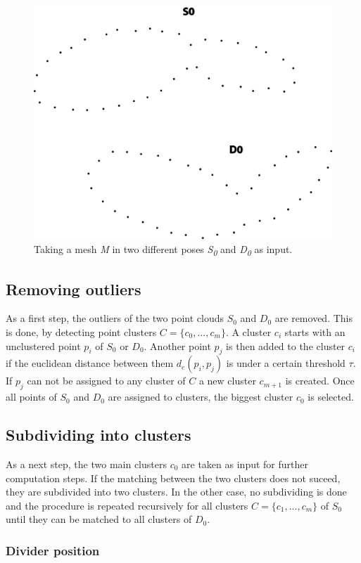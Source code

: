\documentclass[a4paper,english,11pt]{report}
\begin{document}
\begin{figure}
	\centering
	\includegraphics[width=0.7\linewidth]{illustration_original}
	\caption{Taking a mesh \textit{M} in two different poses \textit{S\textsubscript{0}} and \textit{D\textsubscript{0}} as input.}
	\label{fig:dc_original_p2}
\end{figure}

\subsection{Removing outliers}

As a first step, the outliers of the two point clouds $S_0$ and $D_0$ are removed. This is done, by detecting point clusters $C = \{{c_0, ... , c_m}\}$. A cluster $c_i$ starts with an unclustered point $p_i$ of $S_0$ or $D_0$. Another point $p_j$ is then added to the cluster $c_i$ if the euclidean distance between them $d_e(p_i, p_j)$ is under a certain threshold $\tau$. If $p_j$ can not be assigned to any cluster of $C$ a new cluster $c_{m+1}$ is created. Once all points of $S_0$ and $D_0$ are assigned to clusters, the biggest cluster $c_0$ is selected.

\subsection{Subdividing into clusters}

As a next step, the two main clusters $c_0$ are taken as input for further computation steps. If the matching between the two clusters does not suceed, they are subdivided into two clusters. In the other case, no subdividing is done and the procedure is repeated recursively for all clusters $C = \{{c_1, ..., c_m}\} $ of $S_0$ until they can be matched to all clusters of $D_0$.   

\subsubsection{Divider position}
\end{document}
